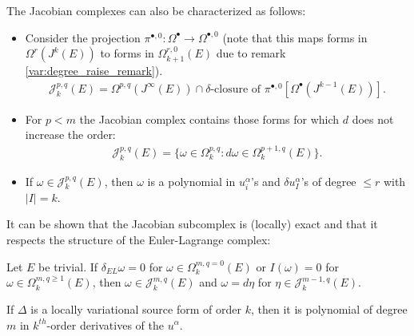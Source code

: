     \begin{property}
        The Jacobian complexes can also be characterized as follows:
        \begin{itemize}
            \item Consider the projection $\pi^{\bullet,0}:\Omega^\bullet\rightarrow\Omega^{\bullet,0}$ (note that this maps forms in $\Omega^r(J^k(E))$ to forms in $\Omega^{r,0}_{k+1}(E)$ due to remark \ref{var:degree_raise_remark}).
            \begin{gather}
                \mathcal{J}^{p,q}_k(E) = \Omega^{p,q}(J^\infty(E))\cap\delta\text{-closure of }\pi^{\bullet,0}\left[\Omega^\bullet(J^{k-1}(E))\right].
            \end{gather}
            \item For $p<m$ the Jacobian complex contains those forms for which $d$ does not increase the order:
            \begin{gather}
                \mathcal{J}^{p,q}_k(E) = \{\omega\in\Omega^{p,q}_k:d\omega\in\Omega^{p+1,q}_k(E)\}.
            \end{gather}
            \item If $\omega\in\mathcal{J}^{p,q}_k(E)$, then $\omega$ is a polynomial in $u^\alpha_i$'s and $\delta u^\alpha_I$'s of degree $\leq r$ with $|I|=k$.
        \end{itemize}
    \end{property}

    It can be shown that the Jacobian subcomplex is (locally) exact and that it respects the structure of the Euler-Lagrange complex:
    \begin{property}[Exactness]
        Let $E$ be trivial. If $\delta_{EL}\omega=0$ for $\omega\in\Omega^{m,q=0}_k(E)$ or $I(\omega)=0$ for $\omega\in\Omega^{m,q\geq1}_k(E)$, then $\omega\in\mathcal{J}^{m,q}_k(E)$ and $\omega=d\eta$ for $\eta\in\mathcal{J}^{m-1,q}_k(E)$.
    \end{property}

    \begin{property}
        If $\Delta$ is a locally variational source form of order $k$, then it is polynomial of degree $m$ in $k^{th}$-order derivatives of the $u^\alpha$.
    \end{property}